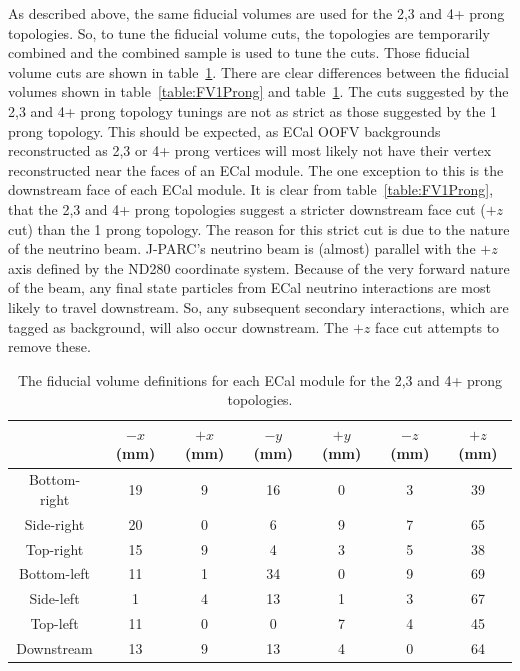 As described above, the same fiducial volumes are used for the 2,3 and 4+ prong topologies.  So, to tune the fiducial volume cuts, the topologies are temporarily combined and the combined sample is used to tune the cuts.  Those fiducial volume cuts are shown in table~\ref{table:FV2+Prong}.  There are clear differences between the fiducial volumes shown in table~\ref{table:FV1Prong} and table~\ref{table:FV2+Prong}.  The cuts suggested by the 2,3 and 4+ prong topology tunings are not as strict as those suggested by the 1 prong topology.  This should be expected, as ECal OOFV backgrounds reconstructed as 2,3 or 4+ prong vertices will most likely not have their vertex reconstructed near the faces of an ECal module.  The one exception to this is the downstream face of each ECal module.  It is clear from table~\ref{table:FV1Prong}, that the 2,3 and 4+ prong topologies suggest a stricter downstream face cut ($+z$ cut) than the 1 prong topology.  The reason for this strict cut is due to the nature of the neutrino beam.  J-PARC's neutrino beam is (almost) parallel with the $+z$ axis defined by the ND280 coordinate system.  Because of the very forward nature of the beam, any final state particles from ECal neutrino interactions are most likely to travel downstream.  So, any subsequent secondary interactions, which are tagged as background, will also occur downstream.  The $+z$ face cut attempts to remove these.
\begin{table}[b!]
  \begin{tabular}{ c c c c c c c }
     & $-x$ (mm) & $+x$ (mm) & $-y$ (mm) & $+y$ (mm) & $-z$ (mm) & $+z$ (mm)  \\ \hline \hline
    Bottom-right & 19 & 9 & 16 & 0 & 3 & 39 \\
    Side-right & 20 & 0 & 6 & 9 & 7 & 65 \\
    Top-right & 15 & 9 & 4 & 3 & 5 & 38 \\
    Bottom-left & 11 & 1 & 34 & 0 & 9 & 69 \\
    Side-left & 1 & 4 & 13 & 1 & 3 & 67 \\
    Top-left & 11 & 0 & 0 & 7 & 4 & 45 \\
    Downstream & 13 & 9 & 13 & 4 & 0 & 64  \\
  \end{tabular}
  \caption{The fiducial volume definitions for each ECal module for the 2,3 and 4+ prong topologies.}
  \label{table:FV2+Prong}
\end{table}
